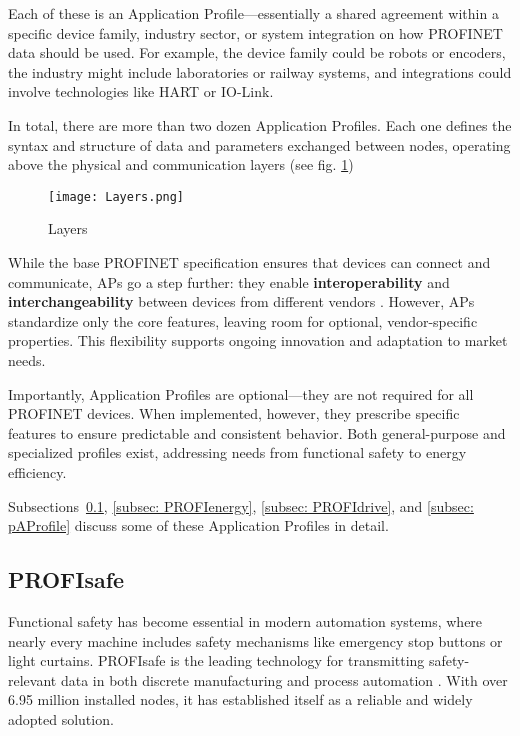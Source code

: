 \documentclass[conference]{IEEEtran}
\begin{document}
Each of these is an Application Profile—essentially a shared agreement within a specific device family, industry sector, or system integration on how PROFINET data should be used. For example, the device family could be robots or encoders, the industry might include laboratories or railway systems, and integrations could involve technologies like HART or IO-Link.

In total, there are more than two dozen Application Profiles. Each one defines the syntax and structure of data and parameters exchanged between nodes, operating above the physical and communication layers (see fig. \ref{fig:layers})

\begin{figure}[h!]
    \centering
    \texttt{[image: Layers.png]}
    \caption{Layers}
    \label{fig:layers}
\end{figure}

While the base PROFINET specification ensures that devices can connect and communicate, APs go a step further: they enable \textbf{interoperability} and \textbf{interchangeability} between devices from different vendors \cite{profinet_profiles}. However, APs standardize only the core features, leaving room for optional, vendor-specific properties. This flexibility supports ongoing innovation and adaptation to market needs.

Importantly, Application Profiles are optional—they are not required for all PROFINET devices. When implemented, however, they prescribe specific features to ensure predictable and consistent behavior. Both general-purpose and specialized profiles exist, addressing needs from functional safety to energy efficiency.

Subsections~\ref{subsec:profisafe}, \ref{subsec: PROFIenergy}, \ref{subsec: PROFIdrive}, and \ref{subsec: pAProfile} discuss some of these Application Profiles in detail.


\subsection{PROFIsafe}
\label{subsec:profisafe}

Functional safety has become essential in modern automation systems, where nearly every machine includes safety mechanisms like emergency stop buttons or light curtains. PROFIsafe is the leading technology for transmitting safety-relevant data in both discrete manufacturing and process automation \cite{profinet_profisafe}. With over 6.95 million installed nodes, it has established itself as a reliable and widely adopted solution.
\end{document}
